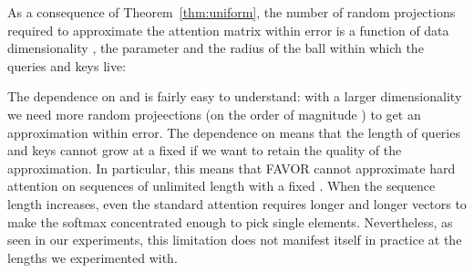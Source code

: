 As a consequence of Theorem~\ref{thm:uniform}, the number  of random projections required to approximate the attention matrix within  error is a function of data dimensionality , the parameter  and the radius  of the ball within which the queries and keys live:

The dependence on  and  is fairly easy to understand: with a larger dimensionality  we need more random projeections (on the order of magnitude ) to get an approximation within  error. The dependence on  means that the length of queries and keys cannot grow at a fixed  if we want to retain the quality of the approximation.
In particular, this means that FAVOR cannot approximate hard attention on sequences of unlimited length with a fixed . When the sequence length increases, even the standard attention requires longer and longer vectors to make the softmax concentrated enough to pick single elements. Nevertheless, as seen in our experiments, this limitation does not manifest itself in practice at the lengths we experimented with.